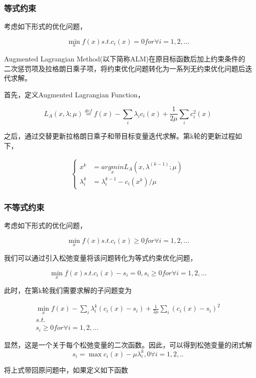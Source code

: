 \subsubsection{等式约束}

考虑如下形式的优化问题，

$$
\min_x f(x) s.t. c_i(x) = 0 for \forall i = 1, 2, ...
$$


Augmented Lagrangian Method(以下简称ALM)在原目标函数后加上约束条件的二次惩罚项及拉格朗日乘子项，将约束优化问题转化为一系列无约束优化问题后迭代求解。

首先，定义Augmented Lagrangian Function，

$$
L_A(x, \lambda; \mu)\overset{def}{=}f(x) - \sum_i \lambda_i c_i(x)+\frac{1}{2\mu}\sum_i c_i^2(x)
$$

之后，通过交替更新拉格朗日乘子和带目标变量迭代求解。第k轮的更新过程如下，

\begin{align}
\left\{
\begin{matrix}
x^k&=\underset{x}{argmin} L_A(x, \lambda^(k-1);\mu) \\
\lambda_i^k&=\lambda_i^{k-1}-c_i(x^k)/\mu
\end{matrix}
\right.
\end{align}

\subsubsection{不等式约束}

考虑如下形式的优化问题，

$$
\min_x f(x) s.t. c_i(x) \ge 0 for \forall i = 1, 2, ...
$$

我们可以通过引入松弛变量将该问题转化为等式约束优化问题，

$$
\min_x f(x) s.t. c_i(x) -s_i = 0, s_i \ge 0 for \forall i = 1, 2, ...
$$

此时，在第k轮我们需要求解的子问题变为

\begin{align}
\min_x f(x)-\sum_i \lambda_i^k(c_i(x)-s_i)+\frac{1}{2\mu}\sum_i (c_i(x)-s_i)^2 \\
s.t. \\
s_i \ge 0 for \forall i = 1, 2, ...
\end{align}

显然，这是一个关于每个松弛变量的二次函数。因此，可以得到松弛变量的闭式解
$$
s_i = \max {c_i(x)-\mu\lambda_i^k, 0} \forall i=1,2,..
$$

将上式带回原问题中，如果定义如下函数

